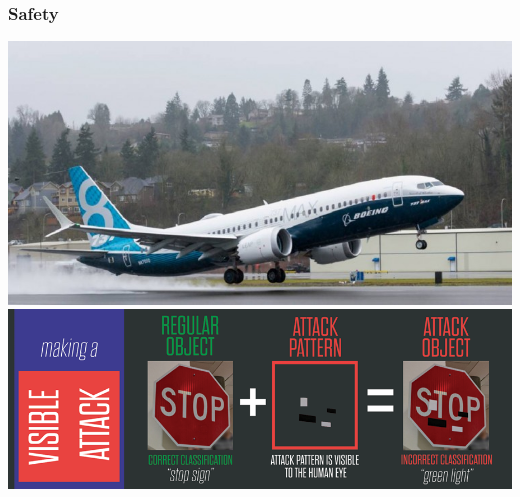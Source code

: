 \documentclass{beamer}
\begin{document}
\begin{frame}
  \frametitle{Safety}
  \centering
  \includegraphics[width=0.75\columnwidth]{figures/boeing_max_8}
  \\
  \includegraphics[width=0.75\columnwidth]{figures/attack}
\end{frame}

\end{document}

